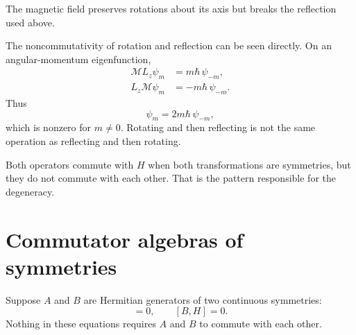 The magnetic field preserves rotations about its axis but breaks the reflection used above.

\begin{classroomqa}
\end{classroomqa}

The noncommutativity of rotation and reflection can be seen directly. On an angular-momentum eigenfunction,
\begin{align}
\mathcal M L_z\psi_m
&=m\hbar\,\psi_{-m},\\
L_z\mathcal M\psi_m
&=-m\hbar\,\psi_{-m}.
\end{align}
Thus
\begin{equation}
[\mathcal M,L_z]\psi_m
=2m\hbar\,\psi_{-m},
\end{equation}
which is nonzero for \(m\neq0\). Rotating and then reflecting is not the same operation as reflecting and then rotating.

Both operators commute with \(H\) when both transformations are symmetries, but they do not commute with each other. That is the pattern responsible for the degeneracy.

\begin{classroomqa}
\end{classroomqa}

\section{Commutator algebras of symmetries}

Suppose \(A\) and \(B\) are Hermitian generators of two continuous symmetries:
\begin{equation}
[A,H]=0,
\qquad
[B,H]=0.
\end{equation}
Nothing in these equations requires \(A\) and \(B\) to commute with each other.

